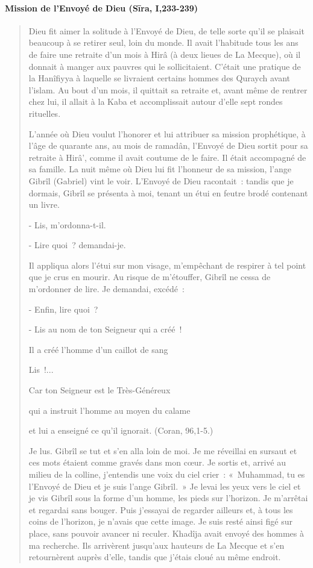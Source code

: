 \paragraph{Mission de l'Envoyé de Dieu (Sīra,
I,233-239)}
\begin{quotation}
    

Dieu fit aimer la solitude à l'Envoyé de Dieu, de telle sorte qu'il se
plaisait beaucoup à se retirer seul, loin du monde. Il avait l'habitude
tous les ans de faire une retraite d'un mois à Hirâ (à deux lieues de La
Mecque), où il donnait à manger aux pauvres qui le sollicitaient.
C'était une pratique de la Hanîfiyya à laquelle se livraient certains
hommes des Quraych avant l'islam. Au bout d'un mois, il quittait sa
retraite et, avant même de rentrer chez lui, il allait à la Kaba
et accomplissait autour d'elle sept rondes rituelles.

{L'année où Dieu voulut l'honorer et lui attribuer sa mission
prophétique, à l'âge de quarante ans, au mois de ramadân, l'Envoyé de
Dieu sortit pour sa retraite à Hirâ', comme il avait coutume de le
faire. Il était accompagné de sa famille. La nuit même où Dieu lui fit
l'honneur de sa mission, l'ange Gibrîl (Gabriel) vint le voir. L'Envoyé
de Dieu racontait~: tandis que je dormais, Gibrîl se présenta à moi,
tenant un étui en feutre brodé contenant un livre.}

{- Lis, m'ordonna-t-il.}

{- Lire quoi~? demandai-je.}

{Il appliqua alors l'étui sur mon visage, m'empêchant de respirer à
tel point que je crus en mourir. Au risque de m'étouffer, Gibrîl ne
cessa de m'ordonner de lire. Je demandai, excédé~:}

{- Enfin, lire quoi~?}

{- Lis au nom de ton Seigneur qui a créé~!}

{Il a créé l'homme d'un caillot de sang}

{Lis~!...}

{Car ton Seigneur est le Très-Généreux}

{qui a instruit l'homme au moyen du calame}

{et lui a enseigné ce qu'il ignorait. (Coran, 96,1-5.)}

{Je lus. Gibrîl se tut et s'en alla loin de moi. Je me réveillai en
sursaut et ces mots étaient comme gravés dans mon cœur. Je sortis et,
arrivé au milieu de la colline, j'entendis une voix du ciel crier~:
«~Muhammad, tu es l'Envoyé de Dieu et je suis l'ange Gibrîl.~» Je levai
les yeux vers le ciel et je vis Gibrîl sous la forme d'un homme, les
pieds sur l'horizon. Je m'arrêtai et regardai sans bouger. Puis
j'essayai de regarder ailleurs et, à tous les coins de l'horizon, je
n'avais que cette image. Je suis resté ainsi figé sur place, sans
pouvoir avancer ni reculer. Khadîja avait envoyé des hommes à ma
recherche. Ils arrivèrent jusqu'aux hauteurs de La Mecque et s'en
retournèrent auprès d'elle, tandis que j'étais cloué au même endroit.}


\end{quotation}
